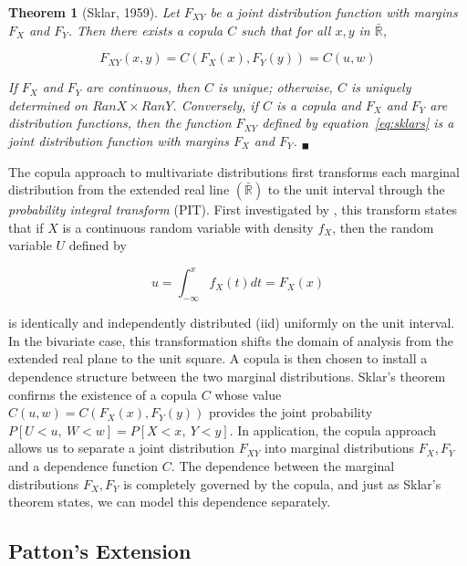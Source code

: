 \documentclass[12pt]{article}
\newtheorem{thm}{Theorem}
\begin{document}
\begin{thm}[Sklar, 1959] \label{thm:skl}
	Let $F_{XY}$ be a joint distribution function with margins $F_{X}$ and $F_{Y}$. Then there exists a copula $C$ such that for all $x,y$ in $\bar{\mathbb{R}}$,

	\begin{equation} \label{eq:sklars}
		F_{XY}\left( x,y\right) =C\left(F_{X}\left(x\right), F_{Y}\left(y\right)\right) = C\left(u,w\right)
	\end{equation}

	If $F_{X}$ and $F_{Y}$ are continuous, then $C$ is unique; otherwise, $C$ is uniquely determined on $RanX\times RanY$. Conversely, if $C$ is a copula and $F_{X}$ and $F_{Y}$ are distribution functions, then the function $F_{XY}$ defined by equation~\ref{eq:sklars} is a joint distribution function with margins $F_{X}$ and $F_{Y}$. $_{\blacksquare}$
\end{thm}

The copula approach to multivariate distributions first transforms each marginal distribution from the extended real line $\left(\bar{\mathbb{R}}\right)$ to the unit interval through the \textit{probability integral transform} (PIT). First investigated by \cite{Rosenblatt_1952}, this transform states that if $X$ is a continuous random variable with density $f_{X}$, then the random variable $U$ defined by

\begin{equation} \label{eqn:PIT}
	u=\int_{-\infty}^{x}f_{X}\left(t\right) dt=F_{X}\left(x\right)
\end{equation}

is identically and independently distributed (iid) uniformly on the unit interval. In the bivariate case, this transformation shifts the domain of analysis from the extended real plane to the unit square. A copula is then chosen to install a dependence structure between the two marginal distributions. Sklar's theorem confirms the existence of a copula $C$ whose value $C\left(u,w\right) = C\left(F_{X}\left(x\right), F_{Y}\left(y\right)\right)$ provides the joint probability $P\left[U < u,~W < w\right] = P\left[X < x,~Y < y\right]$. In application, the copula approach allows us to separate a joint distribution $F_{XY}$ into marginal distributions $F_{X},F_{Y}$ and a dependence function $C$. The dependence between the marginal distributions $F_{X},F_{Y}$ is completely governed by the copula, and just as Sklar's theorem states, we can model this dependence separately.

\subsection{Patton's Extension}
\end{document}
